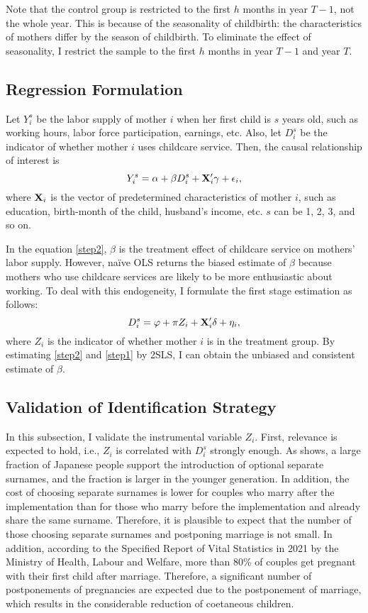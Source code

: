 \documentclass[12pt]{article}
\begin{document}
Note that the control group is restricted to the first $h$ months in year $T-1$, not the whole year.
This is because of the seasonality of childbirth: the characteristics of mothers differ by the season of childbirth\cite{Buckles2013-tj}. 
To eliminate the effect of seasonality, I restrict the sample to the first $h$ months in year $T-1$ and year $T$.

\subsection*{Regression Formulation}
Let $Y_i^s$ be the labor supply of mother $i$ when her first child is $s$ years old, such as working hours, labor force participation, earnings, etc.
Also, let $D_i^s$ be the indicator of whether mother $i$ uses childcare service. 
Then, the causal relationship of interest is 
\begin{equation}
  Y_i^s = \alpha + \beta D_i^s + \vb{X}_i'\vb{\gamma} + \epsilon_i, \label{step2}
\end{equation}
where $\vb{X}_i$ is the vector of predetermined characteristics of mother $i$, such as education, birth-month of the child, husband's income, etc.
$s$ can be 1, 2, 3, and so on.


In the equation \eqref{step2}, $\beta$ is the treatment effect of childcare service on mothers' labor supply.
However, na\"ive OLS returns the biased estimate of $\beta$ because mothers who use childcare services are likely to be more enthusiastic about working.
To deal with this endogeneity, I formulate the first stage estimation as follows:
\begin{equation}
  D_i^s = \varphi + \pi Z_i + \vb{X}_i'\vb{\delta} + \eta_i, \label{step1}
\end{equation}
where $Z_i$ is the indicator of whether mother $i$ is in the treatment group.
By estimating \eqref{step2} and \eqref{step1} by 2SLS, I can obtain the unbiased and consistent estimate of $\beta$. 

\subsection*{Validation of Identification Strategy}
In this subsection, I validate the instrumental variable $Z_i$.
First, relevance is expected to hold, i.e., $Z_i$ is correlated with $D_i^s$ strongly enough. 
As \cite{nhk} shows, a large fraction of Japanese people support the introduction of optional separate surnames, and the fraction is larger in the younger generation.
In addition, the cost of choosing separate surnames is lower for couples who marry after the implementation than for those who marry before the implementation and already share the same surname.
Therefore, it is plausible to expect that the number of those choosing separate surnames and postponing marriage is not small. 
In addition, according to the Specified Report of Vital Statistics in 2021 by the Ministry of Health, Labour and Welfare, more than 80\% of couples get pregnant with their first child after marriage.
Therefore, a significant number of postponements of pregnancies are expected due to the postponement of marriage, which results in the considerable reduction of coetaneous children.
\end{document}
